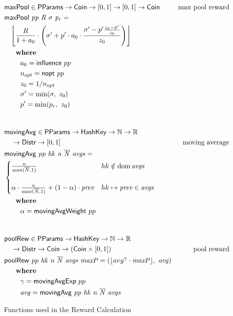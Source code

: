 \begin{figure}[htb]
  \begin{align*}
      & \fun{maxPool} \in \PParams \to \Coin \to [0, 1] \to [0,1] \to \Coin
      & \text{max pool reward} \\
      & \fun{maxPool}~\var{pp}~\var{R}~\sigma~\var{p_r} = \\
      & ~~~\floor*{
           \frac{R}{1 + a_0}
           \cdot
           \left(\sigma' + p'\cdot a_0\cdot\frac{\sigma' - p'\frac{z_0-\sigma'}{z_0}}{z_0}\right)} \\
      & ~~~\where \\
      & ~~~~~~~a_0 = \fun{influence}~pp \\
      & ~~~~~~~n_{opt} = \fun{nopt}~pp \\
      & ~~~~~~~z_0 = 1/n_{opt} \\
      & ~~~~~~~\sigma'=\min(\sigma,~z_0) \\
      & ~~~~~~~p'=\min(p_r,~z_0) \\
      \nextdef
      & \fun{movingAvg} \in \PParams \to \HashKey \to \mathbb{N} \to \mathbb{R} \\
      & ~~~\to \Distr \to [0, 1]
      & \text{moving average} \\
      & \fun{movingAvg}~\var{pp}~\var{hk}~\var{n}~\var{\overline{N}}~\var{avgs} = \\
      & \begin{cases}
        \frac{n}{\max(\overline{N}, 1)}
        & hk\notin \dom\var{avgs}\\
        \\
          \alpha\cdot\frac{n}{\max(\overline{N}, 1)}+(1-\alpha)\cdot\var{prev}
        & hk\mapsto\var{prev}\in\var{avgs}\\
        \end{cases} \\
      & ~~~\where \\
      & ~~~~~~~\alpha = \fun{movingAvgWeight}~pp \\
      \nextdef
      & \fun{poolRew} \in \PParams \to \HashKey \to \mathbb{N} \to \mathbb{R} \\
      & ~~~\to \Distr \to \Coin \to (\Coin \times [0, 1])
      & \text{pool reward} \\
      & \fun{poolRew}~\var{pp}~\var{hk}~\var{n}~\var{\overline{N}}~\var{avgs}~\var{maxP} =
      (\floor*{avg^\gamma\cdot \var{maxP}},~\var{avg})\\
      & ~~~\where \\
      & ~~~~~~~\gamma = \fun{movingAvgExp}~pp \\
      & ~~~~~~~\var{avg} = \fun{movingAvg}~\var{pp}~\var{hk}~\var{n}~\var{\overline{N}}~\var{avgs} \\
  \end{align*}
  \caption{Functions used in the Reward Calculation}
  \label{fig:functions:rewards}
\end{figure}

